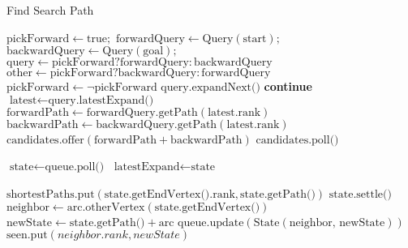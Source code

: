 \begin{algorithm}
    \caption{Find Search Path}
    \label{alg:cchSearch}
    \begin{algorithmic}[1]
        \State $\text{pickForward} \gets \text{true};$ $\text{forwardQuery} \gets \text{Query}(\text{start});$$\text{backwardQuery} \gets \text{Query}(\text{goal});$
            \State $\text{query} \gets \text{pickForward} ? \text{forwardQuery} : \text{backwardQuery}$
            \State $\text{other} \gets \text{pickForward} ? \text{backwardQuery} : \text{forwardQuery}$
            \State $\text{pickForward} \gets \neg \text{pickForward}$
                 $\text{query.expandNext()}$
            \Else
                 \textbf{ continue}
            \EndIf            
            \State $\text{latest} \gets \text{query.latestExpand()}$
                \State $\text{forwardPath} \gets \text{forwardQuery.getPath}(\text{latest.rank})$
                \State $\text{backwardPath} \gets \text{backwardQuery.getPath}(\text{latest.rank})$
                \State $\text{candidates.offer}(\text{forwardPath} + \text{backwardPath})$
            \EndIf
        \EndWhile
        \State \Return $\text{candidates.poll()}$
    \EndFunction

    \State $\text{state} \gets \text{queue.poll()}$
    \State $\text{latestExpand} \gets \text{state}$
    
        \State $\text{shortestPaths.put}(\text{state.getEndVertex().rank}, \text{state.getPath()})$
    \EndIf
    \State $\text{state.settle()}$
        \State $\text{neighbor} \gets \text{arc.otherVertex}(\text{state.getEndVertex()})$
        \State $\text{newState} \gets \text{state.getPath()} + \text{arc}$
        \State $\text{queue.update}(\text{State}(\text{neighbor, newState}))$
        \State $\text{seen.put}(neighbor.rank, newState)$
            
        \EndIf
    \EndFor
    \EndProcedure
    \end{algorithmic}
\end{algorithm}